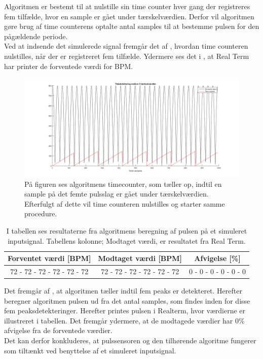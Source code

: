 Algoritmen er bestemt til at nulstille sin time counter hver gang der registreres fem tilfælde, hvor en sample er gået under tærskelværdien. Derfor vil algoritmen gøre brug af time counterens optalte antal samples til at bestemme pulsen for den pågældende periode. \\
Ved at indsende det simulerede signal fremgår det af , hvordan time counteren nulstilles, når der er registreret fem tilfælde. Ydermere ses det i , at Real Term har printer de forventede værdi for BPM.
\begin{figure}[H]
	\centering
	\includegraphics[scale=0.4]{figures/cDesign/timecounter_puls_pic.png}
	\caption{På figuren ses algoritmens timecounter, som tæller op, indtil en sample på det femte pulsslag er gået under tærskelværdien. Efterfulgt af dette vil time counteren nulstilles og starter samme procedure.}
\label{fig:timecounter_puls_realterm}
\end{figure}
\begin{table}[H]
	\centering
	\begin{tabular}{ccc}
		\hline
		\rowcolor[HTML]{C0C0C0} 
		Forventet værdi [BPM] & Modtaget værdi [BPM] & Afvigelse [\%]\\ \hline
		72 - 72 - 72 - 72 - 72 - 72         & 72 - 72 - 72 - 72 - 72 - 72         & 0 - 0 - 0 - 0 - 0 - 0 \\ \hline
	\end{tabular}
	\caption{I tabellen ses resultaterne fra algoritmens beregning af pulsen på et simuleret inputsignal. Tabellens kolonne; Modtaget værdi, er resultatet fra Real Term.}
	\label{tab:test_puls_realterm}
\end{table} \vspace{-0.5cm}

Det fremgår af , at algoritmen tæller indtil fem peaks er detekteret. Herefter beregner algoritmen pulsen ud fra det antal samples, som findes inden for disse fem peaksdetekteringer. Herefter printes pulsen i Realterm, hvor værdierne er illustreret i tabellen. Det fremgår ydermere, at de modtagede værdier har 0\% afvigelse fra de forventede værdier. \\
Det kan derfor konkluderes, at pulssensoren og den tilhørende algoritme fungerer som tiltænkt ved benyttelse af et simuleret inputsignal. 

